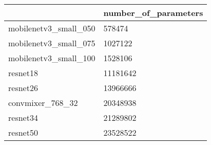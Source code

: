 \begin{tabular}{ll}
\toprule
 & number_of_parameters \\
\midrule
mobilenetv3_small_050 & 578474 \\
mobilenetv3_small_075 & 1027122 \\
mobilenetv3_small_100 & 1528106 \\
resnet18 & 11181642 \\
resnet26 & 13966666 \\
convmixer_768_32 & 20348938 \\
resnet34 & 21289802 \\
resnet50 & 23528522 \\
\bottomrule
\end{tabular}
